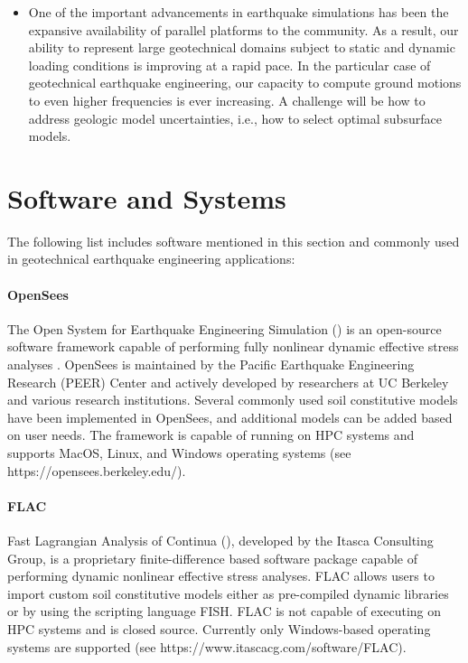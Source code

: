 \begin{itemize}
\vspace{2mm}

\item One of the important advancements in earthquake simulations has been the expansive availability of parallel platforms to the community. As a result, our ability to represent large geotechnical domains subject to static and dynamic loading conditions is improving at a rapid pace. In the particular case of geotechnical earthquake engineering, our capacity to compute ground motions to even higher frequencies is ever increasing. A challenge will be how to address geologic model uncertainties, i.e., how to select optimal subsurface models.

\end{itemize}

\section{Software and Systems}
\label{sec:response_geotech_tools}

The following list includes software mentioned in this section and commonly used in geotechnical earthquake engineering applications:

\paragraph{OpenSees}
The Open System for Earthquake Engineering Simulation () is an open-source software framework capable of performing fully nonlinear dynamic effective stress analyses \citep{mckenna2011opensees}. OpenSees is maintained by the Pacific Earthquake Engineering Research (PEER) Center and actively developed by researchers at UC Berkeley and various research institutions. Several commonly used soil constitutive models have been implemented in OpenSees, and additional models can be added based on user needs. The framework is capable of running on HPC systems and supports MacOS, Linux, and Windows operating systems (see https://opensees.berkeley.edu/).

\paragraph{FLAC}
Fast Lagrangian Analysis of Continua (), developed by the Itasca Consulting Group, is a proprietary finite-difference based software package capable of performing dynamic nonlinear effective stress analyses. FLAC allows users to import custom soil constitutive models either as pre-compiled dynamic libraries or by using the scripting language FISH. FLAC is not capable of executing on HPC systems and is closed source. Currently only Windows-based operating systems are supported (see https://www.itascacg.com/software/FLAC).

